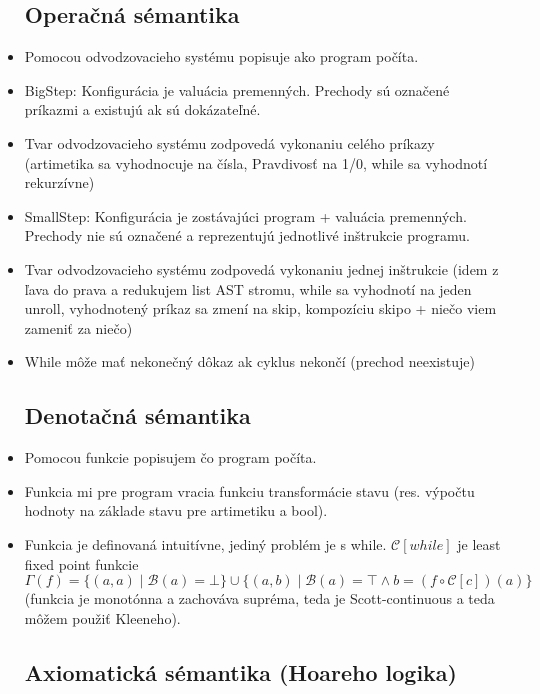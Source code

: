 \documentclass[paper=a4, fontsize=11pt]{scrartcl} %
\numberwithin{equation}{section} %
\numberwithin{figure}{section} %
\numberwithin{table}{section} %
\begin{document}
\begin{itemize}
	\subsection{Operačná sémantika}
	
	\item Pomocou odvodzovacieho systému popisuje ako program počíta.
	
	\item BigStep: Konfigurácia je valuácia premenných. Prechody sú označené príkazmi a existujú ak sú dokázateľné.
	
	\item Tvar odvodzovacieho systému zodpovedá vykonaniu celého príkazy (artimetika sa vyhodnocuje na čísla, Pravdivosť na 1/0, while sa vyhodnotí rekurzívne)
	
	\item SmallStep: Konfigurácia je zostávajúci program + valuácia premenných. Prechody nie sú označené a reprezentujú jednotlivé inštrukcie programu.
	
	\item Tvar odvodzovacieho systému zodpovedá vykonaniu jednej inštrukcie (idem z ľava do prava a redukujem list AST stromu, while sa vyhodnotí na jeden unroll, vyhodnotený príkaz sa zmení na skip, kompozíciu skipo + niečo viem zameniť za niečo)
	
	\item While môže mať nekonečný dôkaz ak cyklus nekončí (prechod neexistuje)
	
	\subsection{Denotačná sémantika}
	
	\item Pomocou funkcie popisujem čo program počíta.
	
	\item Funkcia mi pre program vracia funkciu transformácie stavu (res. výpočtu hodnoty na základe stavu pre artimetiku a bool).
	
	\item Funkcia je definovaná intuitívne, jediný problém je s while. $\mathcal{C}[while]$ je least fixed point funkcie $\Gamma(f) = \{ (a, a) \mid \mathcal{B}(a) = \bot \} \cup \{ (a,b) \mid \mathcal{B}(a) = \top \land b = (f \circ \mathcal{C}[c])(a) \}$ (funkcia je monotónna a zachováva supréma, teda je Scott-continuous a teda môžem použiť Kleeneho).
	
	\subsection{Axiomatická sémantika (Hoareho logika)}
	

\end{itemize}
\end{document}
